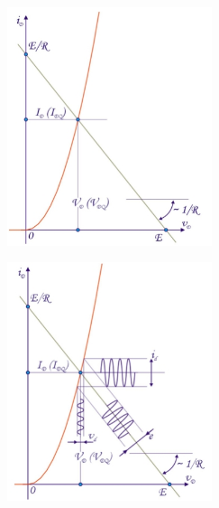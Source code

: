 \begin{figure}[h!]
	\centering
	\begin{minipage}{.5\textwidth}
		\centering
		\includegraphics[width=6cm]{figures/ch02/small_signal_resp4.jpg}
		\label{fig:small_signal_resp4}
	\end{minipage}%
	\begin{minipage}{.5\textwidth}
		\centering
		\includegraphics[width=6cm]{figures/ch02/small_signal_resp6.jpg}
		\label{fig:small_signal_resp6}
	\end{minipage}
\end{figure}


